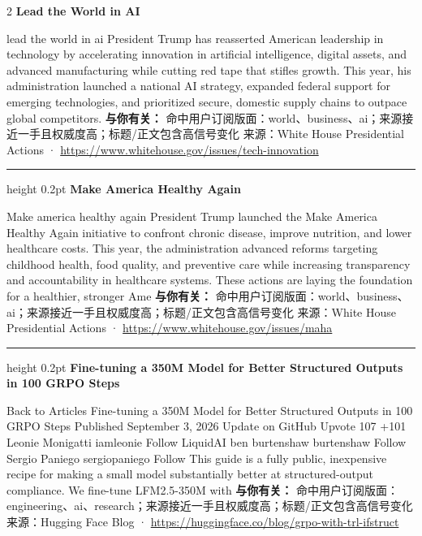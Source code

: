 \documentclass[10.5pt]{ctexart}
\begin{document}
\begin{multicols}{2}
{\large\bfseries Lead the World in AI}\par
lead the world in ai President Trump has reasserted American leadership in technology by accelerating innovation in artificial intelligence, digital assets, and advanced manufacturing while cutting red tape that stifles growth. This year, his administration launched a national AI strategy, expanded federal support for emerging technologies, and prioritized secure, domestic supply chains to outpace global competitors.
\textbf{与你有关：} 命中用户订阅版面：world、business、ai；来源接近一手且权威度高；标题/正文包含高信号变化
{\footnotesize\color{ormuted} 来源：White House Presidential Actions · \url{https://www.whitehouse.gov/issues/tech-innovation}}
\vspace{2mm}
\hrule height 0.2pt
\vspace{2mm}
{\large\bfseries Make America Healthy Again}\par
Make america healthy again President Trump launched the Make America Healthy Again initiative to confront chronic disease, improve nutrition, and lower healthcare costs. This year, the administration advanced reforms targeting childhood health, food quality, and preventive care while increasing transparency and accountability in healthcare systems. These actions are laying the foundation for a healthier, stronger Ame
\textbf{与你有关：} 命中用户订阅版面：world、business、ai；来源接近一手且权威度高；标题/正文包含高信号变化
{\footnotesize\color{ormuted} 来源：White House Presidential Actions · \url{https://www.whitehouse.gov/issues/maha}}
\vspace{2mm}
\hrule height 0.2pt
\vspace{2mm}
{\large\bfseries Fine-tuning a 350M Model for Better Structured Outputs in 100 GRPO Steps}\par
Back to Articles Fine-tuning a 350M Model for Better Structured Outputs in 100 GRPO Steps Published September 3, 2026 Update on GitHub Upvote 107 +101 Leonie Monigatti iamleonie Follow LiquidAI ben burtenshaw burtenshaw Follow Sergio Paniego sergiopaniego Follow This guide is a fully public, inexpensive recipe for making a small model substantially better at structured-output compliance. We fine-tune LFM2.5-350M with
\textbf{与你有关：} 命中用户订阅版面：engineering、ai、research；来源接近一手且权威度高；标题/正文包含高信号变化
{\footnotesize\color{ormuted} 来源：Hugging Face Blog · \url{https://huggingface.co/blog/grpo-with-trl-ifstruct}}
\vspace{2mm}

\end{multicols}
\end{document}
